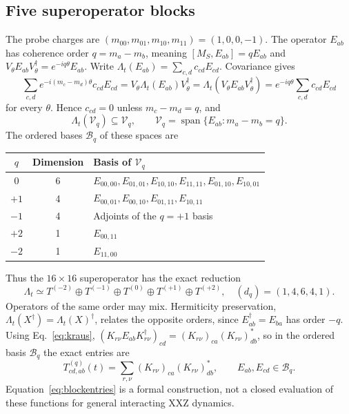 \documentclass[11pt,a4paper]{article}
\begin{document}
\subsection{Five superoperator blocks}

The probe charges are $(m_{00},m_{01},m_{10},m_{11})=(1,0,0,-1)$.
The operator $E_{ab}$ has coherence order $q=m_a-m_b$, meaning
$[M_S,E_{ab}]=qE_{ab}$ and $V_\theta E_{ab}V_\theta^\dagger=e^{-iq\theta}E_{ab}$.
Write $\Lambda_t(E_{ab})=\sum_{c,d}c_{cd}E_{cd}$. Covariance gives
\begin{equation}
 \sum_{c,d}e^{-i(m_c-m_d)\theta}c_{cd}E_{cd}
 =V_\theta\Lambda_t(E_{ab})V_\theta^\dagger
 =\Lambda_t(V_\theta E_{ab}V_\theta^\dagger)
 =e^{-iq\theta}\sum_{c,d}c_{cd}E_{cd}
\end{equation}
for every $\theta$. Hence $c_{cd}=0$ unless $m_c-m_d=q$, and
\begin{equation}
 \Lambda_t(\mathcal V_q)\subseteq\mathcal V_q,\qquad
 \mathcal V_q=\operatorname{span}\{E_{ab}:m_a-m_b=q\}.
\end{equation}
The ordered bases $\mathcal B_q$ of these spaces are
\begin{center}
\begin{tabular}{@{}ccl@{}}
\toprule
$q$&Dimension&Basis of $\mathcal V_q$\\\midrule
$0$&6&$E_{00,00},E_{01,01},E_{10,10},E_{11,11},E_{01,10},E_{10,01}$\\
$+1$&4&$E_{00,01},E_{00,10},E_{01,11},E_{10,11}$\\
$-1$&4&Adjoints of the $q=+1$ basis\\
$+2$&1&$E_{00,11}$\\
$-2$&1&$E_{11,00}$\\\bottomrule
\end{tabular}
\end{center}
Thus the $16\times16$ superoperator has the exact reduction
\begin{equation}
 \boxed{\Lambda_t\simeq T^{(-2)}\oplus T^{(-1)}\oplus T^{(0)}
               \oplus T^{(+1)}\oplus T^{(+2)},\quad
               (d_q)=(1,4,6,4,1).}
 \label{eq:blocks}
\end{equation}
Operators of the same order may mix. Hermiticity preservation,
$\Lambda_t(X^\dagger)=\Lambda_t(X)^\dagger$, relates the opposite orders,
since $E_{ab}^\dagger=E_{ba}$ has order $-q$. Using
Eq.~\eqref{eq:kraus}, $(K_{r\nu}E_{ab}K_{r\nu}^\dagger)_{cd}
=(K_{r\nu})_{ca}(K_{r\nu})_{db}^*$, so in the ordered basis $\mathcal B_q$
the exact entries are
\begin{equation}
 T^{(q)}_{cd,ab}(t)
 =\sum_{r,\nu}(K_{r\nu})_{ca}(K_{r\nu})_{db}^*,
 \qquad E_{ab},E_{cd}\in\mathcal B_q.
 \label{eq:blockentries}
\end{equation}
Equation~\eqref{eq:blockentries} is a formal construction, not a closed
evaluation of these functions for general interacting XXZ dynamics.
\end{document}

